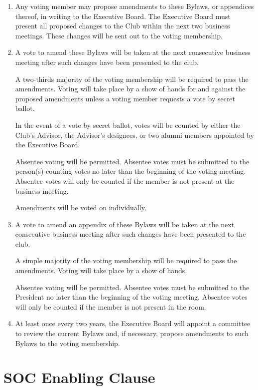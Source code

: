 \documentclass[12pt,letterpaper,oneside]{book}
\begin{document}
\begin{enumerate}

\item Any voting member may propose amendments to these Bylaws, or appendices thereof, in writing to the Executive Board. The Executive Board must present all proposed changes to the Club within the next two business meetings. These changes will be sent out to the voting membership.
\item A vote to amend these Bylaws will be taken at the next consecutive business meeting after such changes have been presented to the club.

\subitem A two-thirds majority of the voting membership will be required to pass the amendments. Voting will take place by a show of hands for and against the proposed amendments unless a voting member requests a vote by secret ballot.

\subitem In the event of a vote by secret ballot, votes will be counted by either the Club’s Advisor, the Advisor’s designees, or two alumni members appointed by the Executive Board.

\subitem Absentee voting will be permitted. Absentee votes must be submitted to the person(s) counting votes no later than the beginning of the voting meeting. Absentee votes will only be counted if the member is not present at the business meeting.

\subitem Amendments will be voted on individually.

\item A vote to amend an appendix of these Bylaws will be taken at the next consecutive business meeting after such changes have been presented to the club.

\subitem A simple majority of the voting membership will be required to pass the amendments. Voting will take place by a show of hands.

\subitem Absentee voting will be permitted. Absentee votes must be submitted to the President no later than the beginning of the voting meeting. Absentee votes will only be counted if the member is not present in the room.

\item At least once every two years, the Executive Board will appoint a committee to review the current Bylaws and, if necessary, propose amendments to such Bylaws to the voting membership.

\end{enumerate}

\chapter{SOC Enabling Clause}
\end{document}
